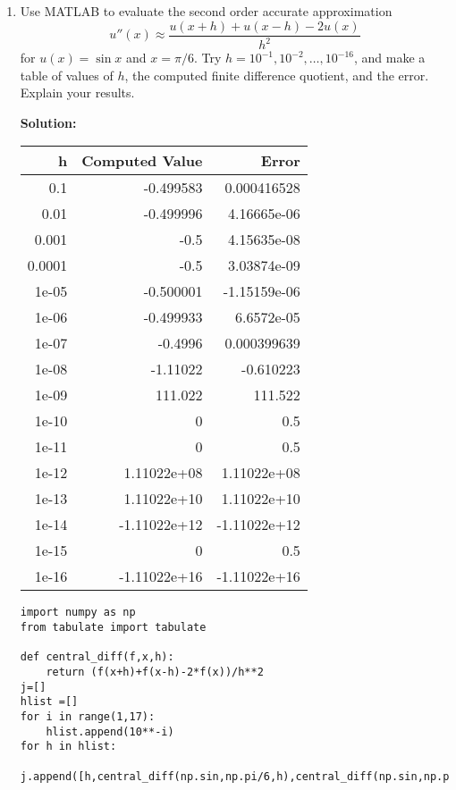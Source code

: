 \documentclass[letterpaper,12pt]{article}
\begin{document}
\begin{enumerate}
\item
Use MATLAB to evaluate the second order accurate approximation 
\[
u'' (x) \approx \frac{u(x+h) + u(x-h) - 2 u(x)}{h^2}
\]
for $u(x) = \sin x$ and $x = \pi / 6$.  Try $h = 10^{-1} , 10^{-2} , \ldots ,
10^{-16}$, and make a table of values of $h$, the computed finite difference
quotient, and the error.  Explain your results.


{\bf Solution:}

	
\begin{tabular}{rrr}
\hline
      h &   Computed Value &         Error \\
\hline
 0.1    &     -0.499583    &   0.000416528 \\
 0.01   &     -0.499996    &   4.16665e-06 \\
 0.001  &     -0.5         &   4.15635e-08 \\
 0.0001 &     -0.5         &   3.03874e-09 \\
 1e-05  &     -0.500001    &  -1.15159e-06 \\
 1e-06  &     -0.499933    &   6.6572e-05  \\
 1e-07  &     -0.4996      &   0.000399639 \\
 1e-08  &     -1.11022     &  -0.610223    \\
 1e-09  &    111.022       & 111.522       \\
 1e-10  &      0           &   0.5         \\
 1e-11  &      0           &   0.5         \\
 1e-12  &      1.11022e+08 &   1.11022e+08 \\
 1e-13  &      1.11022e+10 &   1.11022e+10 \\
 1e-14  &     -1.11022e+12 &  -1.11022e+12 \\
 1e-15  &      0           &   0.5         \\
 1e-16  &     -1.11022e+16 &  -1.11022e+16 \\
\hline
\end{tabular}


	\begin{lstlisting}[style=MyPythonstyle]
import numpy as np
from tabulate import tabulate

def central_diff(f,x,h):
    return (f(x+h)+f(x-h)-2*f(x))/h**2
j=[]
hlist =[]
for i in range(1,17):
    hlist.append(10**-i)
for h in hlist:
    j.append([h,central_diff(np.sin,np.pi/6,h),central_diff(np.sin,np.pi/6,h)+np.sin(np.pi/6)])


\end{lstlisting}
\end{enumerate}
\end{document}
